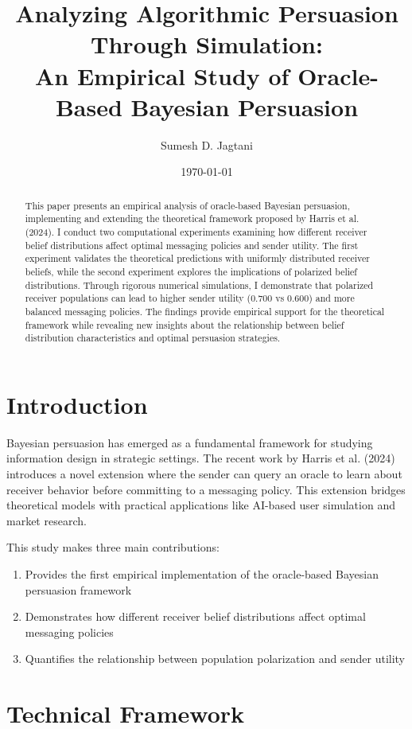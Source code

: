 \documentclass[12pt]{article}
\title{Analyzing Algorithmic Persuasion Through Simulation: \\ An Empirical Study of Oracle-Based Bayesian Persuasion}
\author{Sumesh D. Jagtani}
\date{\today}
\begin{document}
\maketitle

\begin{abstract}
This paper presents an empirical analysis of oracle-based Bayesian persuasion, implementing and extending the theoretical framework proposed by Harris et al. (2024). I conduct two computational experiments examining how different receiver belief distributions affect optimal messaging policies and sender utility. The first experiment validates the theoretical predictions with uniformly distributed receiver beliefs, while the second experiment explores the implications of polarized belief distributions. Through rigorous numerical simulations, I demonstrate that polarized receiver populations can lead to higher sender utility (0.700 vs 0.600) and more balanced messaging policies. The findings provide empirical support for the theoretical framework while revealing new insights about the relationship between belief distribution characteristics and optimal persuasion strategies.
\end{abstract}

\section{Introduction}
Bayesian persuasion has emerged as a fundamental framework for studying information design in strategic settings. The recent work by Harris et al. (2024) introduces a novel extension where the sender can query an oracle to learn about receiver behavior before committing to a messaging policy. This extension bridges theoretical models with practical applications like AI-based user simulation and market research.

This study makes three main contributions:
\begin{enumerate}
    \item Provides the first empirical implementation of the oracle-based Bayesian persuasion framework
    \item Demonstrates how different receiver belief distributions affect optimal messaging policies
    \item Quantifies the relationship between population polarization and sender utility
\end{enumerate}

\section{Technical Framework}
\end{document}
